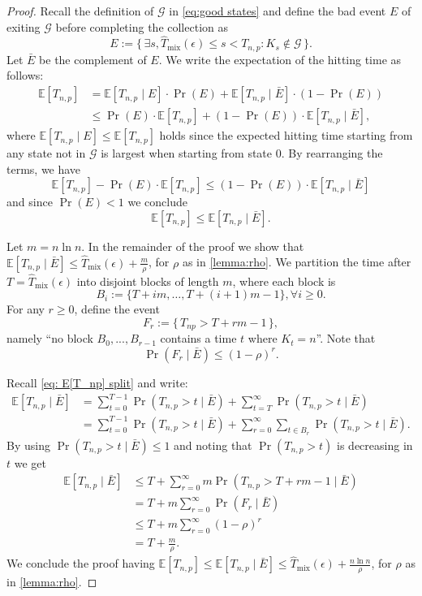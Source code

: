 \documentclass[10pt,a4paper]{amsart}
\newcommand{\E}{\mathbb{E}}
\newcommand{\Tmar}{\hat{T}_{\mathrm{mix}}}
\newcommand{\cond}{\mid}
\begin{document}
\begin{proof}
Recall the definition of $\mathcal{G}$ in \cref{eq:good states} and define the bad event $E$ of exiting $\mathcal{G}$ before completing the collection as
\[
    E := \{\, \exists s, \Tmar(\epsilon) \le s < T_{n,p} : K_s \not\in \mathcal{G} \,\}.
\]
Let $\bar{E}$ be the complement of $E$.
We write the expectation of the hitting time as follows:
\begin{align*}
    \E[T_{n,p}] 
    &= \E[T_{n,p} \cond E] \cdot \Pr(E) + \E[T_{n,p} \cond \bar{E}] \cdot (1 - \Pr(E))
    \\
    &\le \Pr(E) \cdot \E[T_{n,p}] + (1-\Pr(E)) \cdot \E[T_{n,p} \cond \bar{E}],
\end{align*}
where $\E[T_{n,p} \cond E] \le \E[T_{n,p}]$ holds since the expected hitting time starting from any state not in $\mathcal{G}$ is largest when starting from state 0.
By rearranging the terms, we have
\[
    \E[T_{n,p}] - \Pr(E)\cdot\E[T_{n,p}] \le (1-\Pr(E)) \cdot \E[T_{n,p} \cond \bar{E}]
\]
and since $\Pr(E) < 1$ we conclude
\[
    \E[T_{n,p}] \le \E[T_{n,p} \cond \bar{E}].
\]

Let $m = n \ln n$. 
In the remainder of the proof we show that 
$\E[T_{n,p} \cond \bar{E}] \le \Tmar(\epsilon) + \frac{m}{\rho}$, for $\rho$ as in \cref{lemma:rho}.
We partition the time after $T=\Tmar(\epsilon)$ into disjoint blocks of length $m$, where each block is
\[
    B_i := \{T+im,\ldots,T+(i+1)m-1\}, \forall i\ge 0.
\]
For any $r \ge 0$, define the event
\[
    F_r := \{\, T_{np} > T+rm-1 \,\},
\]
namely ``no block $B_0,...,B_{r-1}$ contains a time $t$ where $K_t=n$''.
Note that
\[
    \Pr(F_r \cond \bar{E}) \le (1-\rho)^r.
\]

Recall \cref{eq: E[T_np] split} and write:
\begin{align*}
    \E[T_{n,p} \cond \bar{E}] 
    &= \sum_{t=0}^{T-1} \Pr(T_{n,p} > t \cond \bar{E}) + \sum_{t=T}^{\infty}\Pr(T_{n,p} > t \cond \bar{E})
    \\
    &= \sum_{t=0}^{T-1} \Pr(T_{n,p} > t \cond \bar{E}) + \sum_{r=0}^{\infty} \sum_{t \in B_r}\Pr(T_{n,p} > t \cond \bar{E}).
\end{align*}
By using $\Pr(T_{n,p} > t \cond \bar{E}) \le 1$ and noting that $\Pr(T_{n,p} > t)$ is decreasing in $t$ we get
\begin{align*}
    \E[T_{n,p} \cond \bar{E}] 
    &\le T + \sum_{r=0}^{\infty} m \Pr(T_{n,p} > T + rm - 1 \cond \bar{E})
    \\
    &= T + m\sum_{r=0}^{\infty} \Pr(F_r \cond \bar{E})
    \\
    &\le T + m\sum_{r=0}^{\infty} (1-\rho)^r
    \\
    &= T + \frac{m}{\rho}.
\end{align*}
We conclude the proof having $\E[T_{n,p}] \le \E[T_{n,p} \cond \bar{E}] \le \Tmar(\epsilon) + \frac{n \ln n}{\rho}$, for $\rho$ as in \cref{lemma:rho}.
\end{proof}
\end{document}
